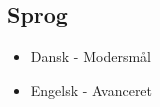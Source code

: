 \documentclass{article}
\begin{document}
\subsection*{Sprog}
\begin{itemize}
    \item Dansk - Modersmål
    \item Engelsk - Avanceret
\end{itemize}
\end{document}
